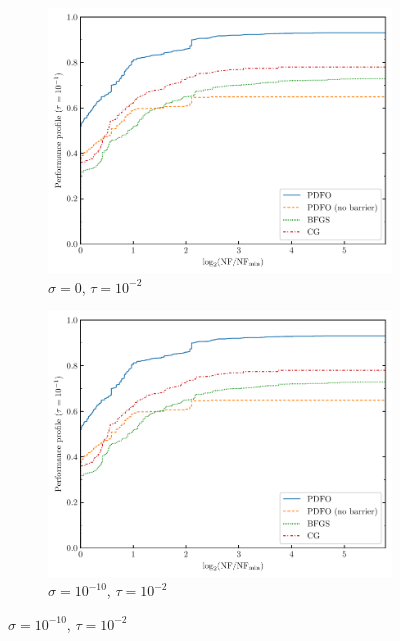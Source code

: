 \documentclass[
    smallextended,  %
    final,        %
]{svjour3}
\begin{document}
\begin{figure}[htbp]
    \begin{subfigure}{.32\textwidth}
        \centering
        \includegraphics[width=\textwidth,page=1]{perf-nan-bfgs_cg_pdfo-50-10-0.01.pdf}
        \caption{$\sigma = 0$, $\tau = 10^{-2}$}
        \label{fig:ppu-fdiff-plain}
    \end{subfigure}
    \hfill
    \begin{subfigure}{.32\textwidth}
        \centering
        \includegraphics[width=\textwidth,page=1]{perf-nan-bfgs_cg_pdfo-50-10-0.01.pdf}
        \caption{$\sigma = 10^{-10}$, $\tau = 10^{-2}$}
    \end{subfigure}

\end{figure}
\end{document}
